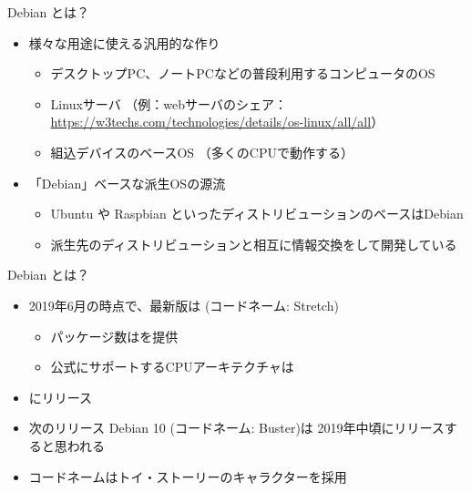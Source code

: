 \begin{frame}{Debian とは？}

\begin{itemize}
  \item 様々な用途に使える汎用的な作り
    \begin{itemize}
    \item デスクトップPC、ノートPCなどの普段利用するコンピュータのOS
    \item Linuxサーバ （例：webサーバのシェア：\url{https://w3techs.com/technologies/details/os-linux/all/all}）
    \item 組込デバイスのベースOS （多くのCPUで動作する）
  \end{itemize}
  \item 「Debian」ベースな派生OSの源流
  \begin{itemize}
    \item Ubuntu や Raspbian といったディストリビューションのベースはDebian
    \item 派生先のディストリビューションと相互に情報交換をして開発している
  \end{itemize}
\end{itemize}

\end{frame}


\begin{frame}{Debian とは？}

\begin{itemize}
  \item 2019年6月の時点で、最新版は {\color{red}{Debian 9.9}} (コードネーム: Stretch)
  \begin{itemize}
    \item パッケージ数は{\color{red}{約51000}}を提供
    \item 公式にサポートするCPUアーキテクチャは{\color{red}{10}}
  \end{itemize}
  \item {\color{red}{約2年毎}}にリリース
  \item 次のリリース Debian 10 (コードネーム: {\color{red}{}}Buster)は 2019年中頃にリリースすると思われる
  \item コードネームはトイ・ストーリーのキャラクターを採用
\end{itemize}

\end{frame}


